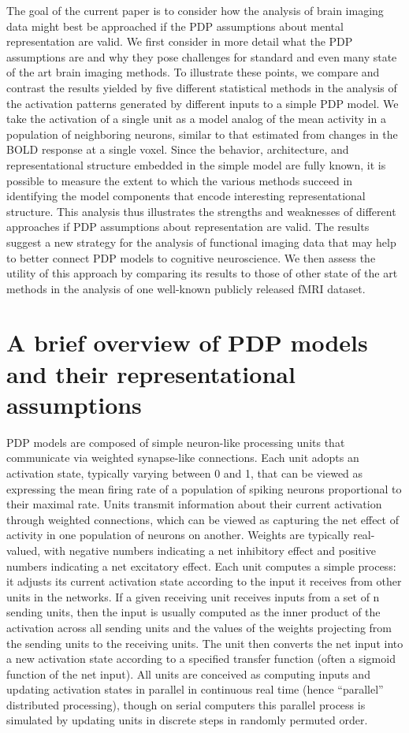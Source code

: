 The goal of the current paper is to consider how the analysis of brain imaging data might best be approached if the PDP assumptions about mental representation are valid. We first consider in more detail what the PDP assumptions are and why they pose challenges for standard and even many state of the art brain imaging methods. To illustrate these points, we compare and contrast the results yielded by five different statistical methods in the analysis of the activation patterns generated by different inputs to a simple PDP model. We take the activation of a single unit as a model analog of the mean activity in a population of neighboring neurons, similar to that estimated from changes in the BOLD response at a single voxel. Since the behavior, architecture, and representational structure embedded in the simple model are fully known, it is possible to measure the extent to which the various methods succeed in identifying the model components that encode interesting representational structure. This analysis thus illustrates the strengths and weaknesses of different approaches if PDP assumptions about representation are valid. The results suggest a new strategy for the analysis of functional imaging data that may help to better connect PDP models to cognitive neuroscience. We then assess the utility of this approach by comparing its results to those of other state of the art methods in the analysis of one well-known publicly released fMRI dataset.

\section{A brief overview of PDP models and their representational assumptions}
PDP models are composed of simple neuron-like processing units that communicate via weighted synapse-like connections\cite{McClellandRumelhart86,RogersMcClellandPDP25}. Each unit adopts an activation state, typically varying between 0 and 1, that can be viewed as expressing the mean firing rate of a population of spiking neurons proportional to their maximal rate\cite{ZipserAndersen88}. Units transmit information about their current activation through weighted connections, which can be viewed as capturing the net effect of activity in one population of neurons on another. Weights are typically real-valued, with negative numbers indicating a net inhibitory effect and positive numbers indicating a net excitatory effect. Each unit computes a simple process: it adjusts its current activation state according to the input it receives from other units in the networks. If a given receiving unit receives inputs from a set of n sending units, then the input is usually computed as the inner product of the activation across all sending units and the values of the weights projecting from the sending units to the receiving units. The unit then converts the net input into a new activation state according to a specified transfer function (often a sigmoid function of the net input). All units are conceived as computing inputs and updating activation states in parallel in continuous real time (hence ``parallel'' distributed processing), though on serial computers this parallel process is simulated by updating units in discrete steps in randomly permuted order.

